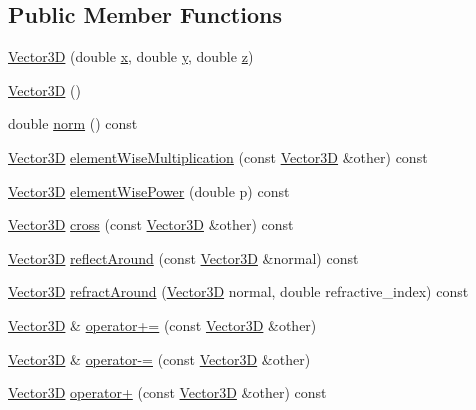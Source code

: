 \subsection*{Public Member Functions}
\begin{DoxyCompactItemize}
\item 
\mbox{\hyperlink{classVector3D_abd851542da40b1168edcad11fa83b7c2}{Vector3D}} (double \mbox{\hyperlink{classVector3D_a3c086dfccfc57dd996e9b8600098a430}{x}}, double \mbox{\hyperlink{classVector3D_adcec384756103d26d1181e45d5a0fd78}{y}}, double \mbox{\hyperlink{classVector3D_a7321f3ff785f275c4d83f7d1b951752a}{z}})
\item 
\mbox{\hyperlink{classVector3D_a0b11a8d75da427b27443d8a94d0d296c}{Vector3D}} ()
\item 
double \mbox{\hyperlink{classVector3D_a176d25c8beea995c9cbf9fb4ad57b87a}{norm}} () const
\item 
\mbox{\hyperlink{classVector3D}{Vector3D}} \mbox{\hyperlink{classVector3D_aa464747455b93d84f15856493692cf04}{element\+Wise\+Multiplication}} (const \mbox{\hyperlink{classVector3D}{Vector3D}} \&other) const
\item 
\mbox{\hyperlink{classVector3D}{Vector3D}} \mbox{\hyperlink{classVector3D_a0006a0a729d3d99259024cdcb354eb5d}{element\+Wise\+Power}} (double p) const
\item 
\mbox{\hyperlink{classVector3D}{Vector3D}} \mbox{\hyperlink{classVector3D_af1b13ca0a65eea7431bfbcd96dcacdee}{cross}} (const \mbox{\hyperlink{classVector3D}{Vector3D}} \&other) const
\item 
\mbox{\hyperlink{classVector3D}{Vector3D}} \mbox{\hyperlink{classVector3D_a513a9bac97abe00e020d1b032fdf9d21}{reflect\+Around}} (const \mbox{\hyperlink{classVector3D}{Vector3D}} \&normal) const
\item 
\mbox{\hyperlink{classVector3D}{Vector3D}} \mbox{\hyperlink{classVector3D_ae9247c4b9b94bca1b65457845fa1e9df}{refract\+Around}} (\mbox{\hyperlink{classVector3D}{Vector3D}} normal, double refractive\+\_\+index) const
\item 
\mbox{\hyperlink{classVector3D}{Vector3D}} \& \mbox{\hyperlink{classVector3D_a546241ecc51e49e05e7672ffde26bbf8}{operator+=}} (const \mbox{\hyperlink{classVector3D}{Vector3D}} \&other)
\item 
\mbox{\hyperlink{classVector3D}{Vector3D}} \& \mbox{\hyperlink{classVector3D_a799f712590c47cc435b929718586555c}{operator-\/=}} (const \mbox{\hyperlink{classVector3D}{Vector3D}} \&other)
\item 
\mbox{\hyperlink{classVector3D}{Vector3D}} \mbox{\hyperlink{classVector3D_ae5153e5e26852627ccea88d399e13c6e}{operator+}} (const \mbox{\hyperlink{classVector3D}{Vector3D}} \&other) const

\end{DoxyCompactItemize}

